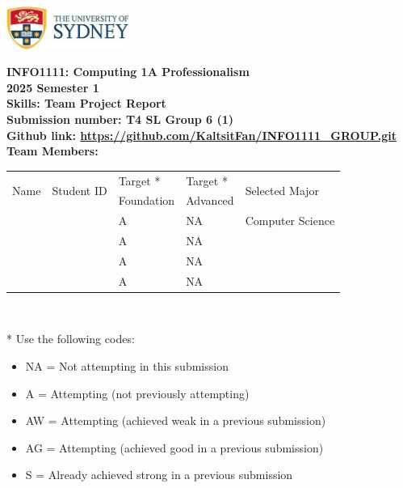 \documentclass[a4paper, 11pt]{report}
\begin{document}
\begin{titlepage}
\begin{flushright}
\includegraphics[width=4cm]{USyd}\\[1cm] 
\end{flushright}

\begin{centering}
\textbf{\huge INFO1111: Computing 1A Professionalism}\\[0.75cm]
\textbf{\huge 2025 Semester 1}\\[2cm]
\textbf{\huge Skills: Team Project Report}\\[2cm]

\textbf{\large Submission number: T4 SL Group 6 (1)}\\[0.5cm]
{\large \textbf{Github link: \url{https://github.com/KaltsitFan/INFO1111_GROUP.git}}}\\[0.75cm]
\textbf{\huge Team Members:}\\[0.75cm]

\begin{tabular}{|p{}|p{}|p{}|p{}|p{}|}
	\hline
	\multirow{2}{*}{Name} & \multirow{2}{*}{Student ID} & Target * & Target * & \multirow{2}{*}{Selected Major} \\
	 & & Foundation & Advanced & \\
	\hline
	\hline
	\raggedright{\studA} & \sidA & A & NA & Computer Science \\
	\hline
	\raggedright{\studB} & \sidB & A & NA & \majB \\
	\hline
	\raggedright{\studC} & \sidC & A & NA & \majC \\
	\hline
	\raggedright{\studD} & \sidD & A & NA & \majD \\
	\hline
\end{tabular}
\\[0.5cm]
\end{centering}

* Use the following codes:
\begin{itemize}
\setlength\itemsep{0em}
\item NA = Not attempting in this submission
\item A = Attempting (not previously attempting)
\item AW = Attempting (achieved weak in a previous submission) 
\item AG = Attempting (achieved good in a previous submission)
\item S = Already achieved strong in a previous submission
\end{itemize}

\thispagestyle{empty}
\end{titlepage}
\end{document}
